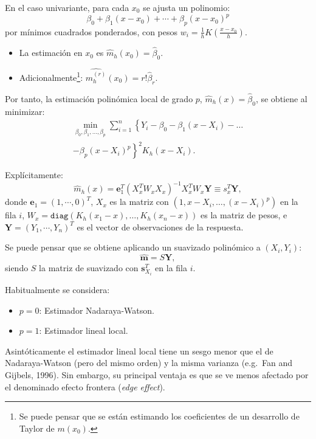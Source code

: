 \documentclass[
]{book}
\theoremstyle{break}
\theoremstyle{definition}
\theoremstyle{definition}
\theoremstyle{definition}
\theoremstyle{definition}
\theoremstyle{remark}
\begin{document}
En el caso univariante, para cada \(x_0\) se ajusta un polinomio:
\[\beta_0+\beta_{1}\left(x - x_0\right) + \cdots 
+ \beta_{p}\left( x-x_0\right)^{p}\]
por mínimos cuadrados ponderados, con pesos
\(w_{i} = \frac{1}{h}K\left(\frac{x-x_0}{h}\right)\).

\begin{itemize}
\item
  La estimación en \(x_0\) es \(\hat{m}_{h}(x_0)=\hat{\beta}_0\).
\item
  Adicionalmente\footnote{Se puede pensar que se están estimando los coeficientes de
    un desarrollo de Taylor de \(m(x_0)\).}:
  \(\widehat{m_{h}^{(r)}}(x_0) = r!\hat{\beta}_{r}\).
\end{itemize}

Por tanto, la estimación polinómica local de grado \(p\), \(\hat{m}_{h}(x)=\hat{\beta}_0\), se obtiene al minimizar:
\[\begin{aligned}
    \min_{\beta_0 ,\beta_1, \ldots, \beta_p}
    \sum_{i=1}^{n}\left\{ Y_{i} - \beta_0 
    -\beta_1(x - X_i) - \ldots \right. \nonumber \\
    \left. -\beta_p(x - X_i)^p \right\}^{2}
    K_{h}(x - X_i).
\end{aligned}\]

Explícitamente:
\[\hat{m}_{h}(x) = \mathbf{e}_{1}^{T} \left(
X_{x}^{T} {W}_{x} 
X_{x} \right)^{-1} X_{x}^{T} 
{W}_{x}\mathbf{Y} \equiv {s}_{x}^{T}\mathbf{Y},\]
donde \(\mathbf{e}_{1} = \left( 1, \cdots, 0\right)^{T}\), \(X_{x}\)
es la matriz con \((1,x - X_i, \ldots, (x - X_i)^p)\) en la fila \(i\),
\(W_{x} = \mathtt{diag} \left( K_{h}(x_{1} - x), \ldots, K_{h}(x_{n} - x) \right)\)
es la matriz de pesos, e \(\mathbf{Y} = \left( Y_1, \cdots, Y_n\right)^{T}\) es el vector de observaciones de la respuesta.

Se puede pensar que se obtiene aplicando un suavizado polinómico a
\((X_i, Y_i)\):
\[\hat{\boldsymbol{m}} = S\mathbf{Y},\]
siendo \(S\) la matriz de suavizado con \(\mathbf{s}_{X_{i}}^{T}\) en la fila \(i\).

Habitualmente se considera:

\begin{itemize}
\item
  \(p=0\): Estimador Nadaraya-Watson.
\item
  \(p=1\): Estimador lineal local.
\end{itemize}

Asintóticamente el estimador lineal local tiene un sesgo menor que el de
Nadaraya-Watson (pero del mismo orden) y la misma varianza (e.g.~Fan and Gijbels, 1996).
Sin embargo, su principal ventaja es que se ve menos afectado por el denominado
efecto frontera (\emph{edge effect}).
\end{document}

